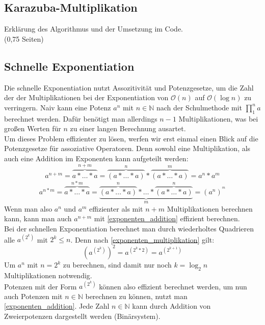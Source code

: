 \documentclass[course=erap]{aspdoc}
\begin{document}
\subsection{Karazuba-Multiplikation}
Erklärung des Algorithmus und der Umsetzung im Code. \\
(0,75 Seiten)

\subsection{Schnelle Exponentiation}
Die schnelle Exponentiation nutzt Assozitivität und Potenzgesetze, um die Zahl der der Multiplikationen bei der Exponentiation von $\mathcal{O}(n)$ auf $\mathcal{O}(\log{}n)$ zu verringern. 
Naiv kann eine Potenz $a^n$ mit $n\in\mathbb{N}$ nach der Schulmethode mit \(\prod_{1}^{n} a \) berechnet werden. 
Dafür benötigt man allerdings $n-1$ Multiplikationen, was bei großen Werten für $n$ zu einer langen Berechnung ausartet.\\
Um dieses Problem effizienter zu lösen, werfen wir erst einmal einen Blick auf die Potenzgesetze für assoziative Operatoren. Denn sowohl eine Multiplikation, als auch eine Addition im Exponenten kann aufgeteilt werden:
\begin{equation}\label{exponenten_addition}
    a^{n+m} = \overbrace{a*\dots*a}^{n+m} = \overbrace{(a*\dots*a)}^n * \overbrace{(a*\dots*a)}^m = a^n * a^m
\end{equation}
\begin{equation}\label{exponenten_multiplikation}
    a^{n*m} = \overbrace{a*\dots*a}^{n*m} = \underbrace{\overbrace{(a*\dots*a)}^n*\dots*\overbrace{(a*\dots*a)}^n}_m = (a^n)^{^m}
\end{equation}
Wenn man also $a^n$ und $a^m$ effizienter als mit $n+m$ Multiplikationen berechnen kann, kann man auch $a^{n+m}$ mit \ref{exponenten_addition} effizient berechnen.\\
Bei der schnellen Exponentiation berechnet man durch wiederholtes Quadrieren alle $a^{(2^k)}$ mit $2^k \le n$. Denn nach \ref{exponenten_multiplikation} gilt:
\[ {\left( a^{(2^k)} \right)}^2 = a^{(2^k*2)} = a^{(2^{k+1})}\]
Um $a^n$ mit $n=2^k$ zu berechnen, sind damit nur noch $k=\log_2n$ Multiplikationen notwendig.
\\Potenzen mit der Form $a^{(2^k)}$ können also effizient berechnet werden, um nun auch Potenzen mit $n\in\mathbb{N}$ berechnen zu können, nutzt man \ref{exponenten_addition}. 
Jede Zahl $n\in\mathbb{N}$ kann durch Addition von Zweierpotenzen dargestellt werden (Binärsystem). \\
\end{document}
